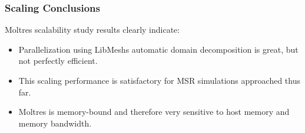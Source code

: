 \begin{frame}
        \frametitle{Scaling Conclusions}
        \begin{block}{Moltres scalability study results clearly indicate:}
        \begin{itemize} 
                \item Parallelization using LibMesh\textsc{}s automatic domain 
                        decomposition is great, but not perfectly efficient.
                \item This scaling performance is satisfactory for MSR 
                        simulations approached thus far.
                \item Moltres is memory-bound and therefore very sensitive to host memory and memory bandwidth.
        \end{itemize}
        \end{block}
\end{frame}



